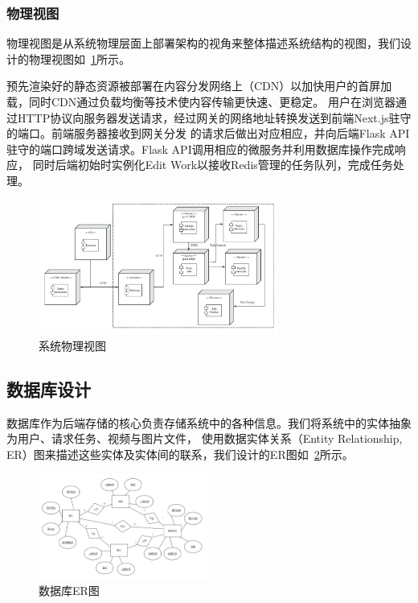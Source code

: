 \subsubsection{物理视图}

物理视图是从系统物理层面上部署架构的视角来整体描述系统结构的视图，我们设计的物理视图如~\ref{fig:system-deploy}所示。

预先渲染好的静态资源被部署在内容分发网络上（CDN）\cite{peng2004cdn}以加快用户的首屏加载，同时CDN通过负载均衡等技术使内容传输更快速、更稳定。
用户在浏览器通过HTTP协议向服务器发送请求，经过网关的网络地址转换发送到前端Next.js驻守的端口。前端服务器接收到网关分发
的请求后做出对应相应，并向后端Flask API驻守的端口跨域发送请求。Flask API调用相应的微服务并利用数据库操作完成响应，
同时后端初始时实例化Edit Work以接收Redis管理的任务队列，完成任务处理。

\begin{figure}[ht]
    \centering
    \includegraphics[width=0.7\textwidth]{source/img/system_deploy.png}
    \caption{系统物理视图}
    \label{fig:system-deploy}
\end{figure}

\subsection{数据库设计}

数据库作为后端存储的核心负责存储系统中的各种信息。我们将系统中的实体抽象为用户、请求任务、视频与图片文件，
使用数据实体关系（Entity Relationship, ER）\cite{chen1976entity}图来描述这些实体及实体间的联系，我们设计的ER图如~\ref{fig:database-ER}所示。

\begin{figure}[ht]
    \centering
    \includegraphics[width=0.5\textwidth]{source/img/database_ER.png}
    \caption{数据库ER图}
    \label{fig:database-ER}
\end{figure}

